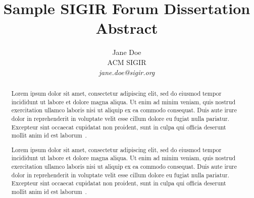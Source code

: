 \documentclass[dissertation]{sigir_forum}
\begin{document}
\title{Sample SIGIR Forum Dissertation Abstract}

\author{
Jane Doe\\ACM SIGIR\\\emph{jane.doe@sigir.org}
}

\maketitle 
\begin{abstract}
Lorem ipsum dolor sit amet, consectetur adipiscing elit, sed do eiusmod tempor incididunt ut labore et dolore magna aliqua. Ut enim ad minim veniam, quis nostrud exercitation ullamco laboris nisi ut aliquip ex ea commodo consequat. Duis aute irure dolor in reprehenderit in voluptate velit esse cillum dolore eu fugiat nulla pariatur. Excepteur sint occaecat cupidatat non proident, sunt in culpa qui officia deserunt mollit anim id est laborum~\citep{forum}.

Lorem ipsum dolor sit amet, consectetur adipiscing elit, sed do eiusmod tempor incididunt ut labore et dolore magna aliqua. Ut enim ad minim veniam, quis nostrud exercitation ullamco laboris nisi ut aliquip ex ea commodo consequat. Duis aute irure dolor in reprehenderit in voluptate velit esse cillum dolore eu fugiat nulla pariatur. Excepteur sint occaecat cupidatat non proident, sunt in culpa qui officia deserunt mollit anim id est laborum~\citet{forum}.
\end{abstract}


\end{document}

